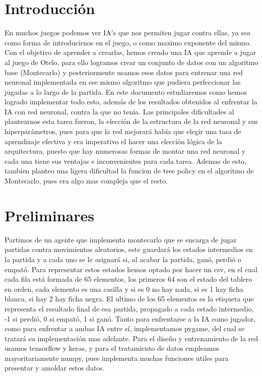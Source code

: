 \documentclass[conference]{IEEEtran}
\begin{document}
\section{Introducción}
En muchos juegos podemos ver IA's que nos permiten jugar contra ellas, ya sea como forma de introducirnos en el juego, o como maximo exponente del mismo.
Con el objetivo de aprender a crearlas, hemos creado una IA que aprende a jugar al juego de Otelo, para ello logramos crear un conjunto de datos con un
algoritmo base (Montecarlo) y posteriormente usamos esos datos para entrenar una red neuronal implementada en ese mismo algoritmo que pudiera perfeccionar las jugadas a lo largo de la 
partida. En este documento estudiaremos como hemos logrado implementar todo esto, además de los resultados obtenidos al enfrentar la IA con red neuronal,
contra la que no tenia. Las principales dificultades al plantearnos esta tarea fueron, la elección de la estructura de la red neuronal y sus hiperparámetros, pues para
que la red mejorará había que elegir una tasa de aprendizaje efectiva y era imperativo el hacer una elección lógica de la arquitectura, puesto que hay numerosas
formas de montar una red neuronal y cada una tiene sus ventajas e inconvenientes para cada tarea. Ademas de esto, tambien planteo una ligera dificultad la funcion
de tree policy en el algoritmo de Montecarlo, pues era algo mas compleja que el resto.
\section{Preliminares}
Partimos de un agente que implementa montecarlo que se encarga de jugar partidas contra movimientos aleatorios, este guardará los estados intermedios 
en la partida y a cada uno se le asignará si, al acabar la partida, ganó, perdió o empató. Para representar estos estados hemos optado por hacer un csv, 
en el cual cada fila está formada de 65 elementos, los primeros 64 son el estado del tablero en orden, cada elemento es una casilla y si es 0 no hay nada,
si es 1 hay ficha blanca, si hay 2 hay ficha negra. El ultimo de los 65 elementos es la etiqueta que representa el resultado final de esa partida, propagado a cada estado intermedio,
-1 si perdió, 0 si empató, 1 si ganó. Tanto para enfrentarse a la IA como jugador, como para enfrentar a ambas IA entre sí, implementamos pygame, del cual se tratará su implementación mas adelante.
Para el diseño y entrenamiento de la red usamos tensorflow y keras, y para el tratamiento de datos empleamos mayoritariamente numpy, pues implementa muchas funciones utiles para presentar y amoldar
estos datos.
\end{document}
